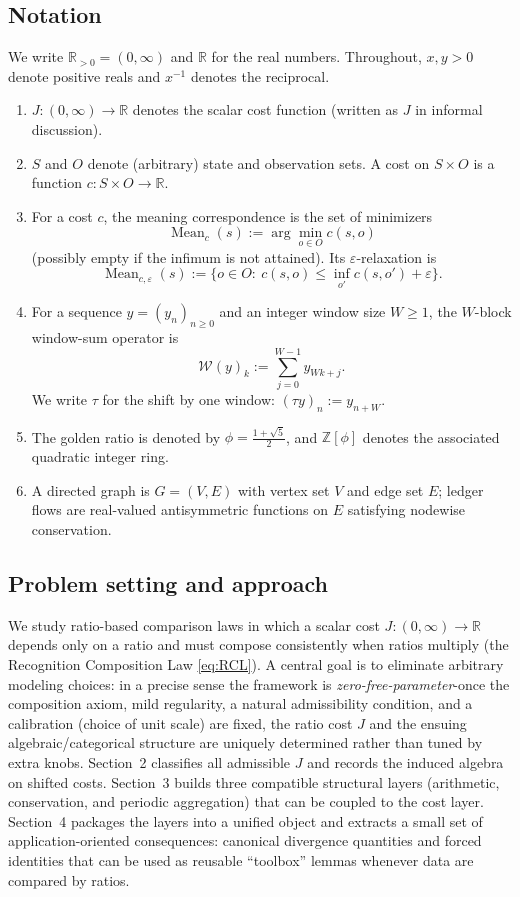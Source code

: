 \documentclass[11pt,reqno]{amsart}
\theoremstyle{plain}
\theoremstyle{definition}
\theoremstyle{remark}
\newcommand{\Jcost}{J}
\newcommand{\RR}{\mathbb{R}}
\newcommand{\ZZ}{\mathbb{Z}}
\newcommand{\Rp}{\RR_{>0}}
\newcommand{\1}{\mathbf{1}}
\DeclareMathOperator{\Mean}{Mean}
\newcommand{\paperadd}[1]{{\color{paperblue}#1}}
\begin{document}
\subsection{Notation}
We write $\Rp=(0,\infty)$ and $\RR$ for the real numbers.
Throughout, $x,y>0$ denote positive reals and $x^{-1}$ denotes the reciprocal.
\begin{enumerate}[label=(\alph*),nosep]
\item $\Jcost:(0,\infty)\to\RR$ denotes the scalar cost function (written as $J$ in informal discussion).
\item $S$ and $O$ denote (arbitrary) state and observation sets. A cost on $S\times O$ is a function $c:S\times O\to\RR$.
\item For a cost $c$, the meaning correspondence is the set of minimizers
\[
\Mean_c(s):=\arg\min_{o\in O}c(s,o)
\]
(possibly empty if the infimum is not attained). Its $\varepsilon$-relaxation is
\[
\Mean_{c,\varepsilon}(s):=\{o\in O:\ c(s,o)\le \inf_{o'}c(s,o')+\varepsilon\}.
\]
\item For a sequence $y=(y_n)_{n\ge 0}$ and an integer window size $W\ge 1$, the $W$-block window-sum operator is
\[
\mathcal W(y)_k:=\sum_{j=0}^{W-1}y_{Wk+j}.
\]
We write $\tau$ for the shift by one window: $(\tau y)_n:=y_{n+W}$.
\item The golden ratio is denoted by $\phi=\frac{1+\sqrt5}{2}$, and $\ZZ[\phi]$ denotes the associated quadratic integer ring.
\item A directed graph is $G=(V,E)$ with vertex set $V$ and edge set $E$; ledger flows are real-valued antisymmetric functions on $E$ satisfying nodewise conservation.
\end{enumerate}

\subsection*{Problem setting and approach}
We study ratio-based comparison laws in which a scalar cost $J:(0,\infty)\to\RR$ depends only on a ratio and must compose consistently when ratios multiply (the Recognition Composition Law \eqref{eq:RCL}). A central goal is to eliminate arbitrary modeling choices: in a precise sense the framework is \emph{\paperadd{zero-free-parameter}}-once the composition axiom, mild regularity, a natural admissibility condition, and a calibration (choice of unit scale) are fixed, the ratio cost $J$ and the ensuing algebraic/categorical structure are uniquely determined rather than tuned by extra knobs. Section~2 classifies all admissible $J$ and records the induced algebra on shifted costs. Section~3 builds three compatible structural layers (arithmetic, conservation, and periodic aggregation) that can be coupled to the cost layer. Section~4 packages the layers into a unified object and extracts a small set of application-oriented consequences: canonical divergence quantities and forced identities that can be used as reusable ``toolbox'' lemmas whenever data are compared by ratios.
\end{document}

